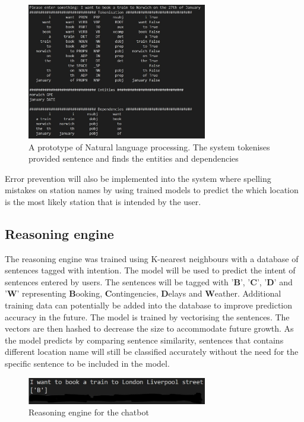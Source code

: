 \documentclass[11pt]{article}
\begin{document}
\begin{figure}[!htb]
	\centering
	\includegraphics[width=0.7\textwidth]{NLP_Prototype}
	\caption{A prototype of Natural language processing. The system tokenises provided sentence and finds the entities and dependencies }\label{fig:NLP_Prototype}
\end{figure}

Error prevention will also be implemented into the system where spelling mistakes on station names by using trained models to predict the which location is the most likely station that is intended by the user.

\subsection{Reasoning engine}
The reasoning engine was trained using K-nearest neighbours with a database of sentences tagged with intention. The model will be used to predict the intent of sentences entered by users. The sentences will be tagged with '\textbf{B}', '\textbf{C}', '\textbf{D}' and '\textbf{W}' representing \textbf{B}ooking, \textbf{C}ontingencies, \textbf{D}elays and \textbf{W}eather. Additional training data can potentially be added into the database to improve prediction accuracy in the future. The model is trained by vectorising the sentences. The vectors are then hashed to decrease the size to accommodate future growth. As the model predicts by comparing sentence similarity, sentences that contains different location name will still be classified accurately without the need for the specific sentence to be included in the model.

\begin{figure}[!htb]
	\centering
	\includegraphics[width=0.7\textwidth]{Reasoning_Prototype}
	\caption{Reasoning engine for the chatbot }\label{fig:Reasoning_Prototype}
\end{figure}
\end{document}
